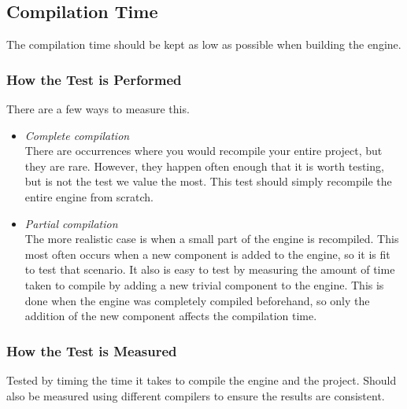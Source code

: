 \subsection{Compilation Time}
The compilation time should be kept as low as possible when building the engine.


\subsubsection*{How the Test is Performed}
There are a few ways to measure this.

\begin{itemize}

    \item \noindent\textit{Complete compilation}\\
    There are occurrences where you would recompile your entire project, but they are rare.
    However, they happen often enough that it is worth testing, but is not the test we value the most. This test should simply recompile the entire engine from scratch.

    \item \noindent\textit{Partial compilation}\\
    The more realistic case is when a small part of the engine is recompiled.
    This most often occurs when a new component is added to the engine, so it is fit to test that scenario.
    It also is easy to test by measuring the amount of time taken to compile by adding a new trivial component to the engine.
    This is done when the engine was completely compiled beforehand, so only the addition of the new component affects the compilation time.

\end{itemize}

\subsubsection*{How the Test is Measured}
Tested by timing the time it takes to compile the engine and the project. 
Should also be measured using different compilers to ensure the results are consistent.
